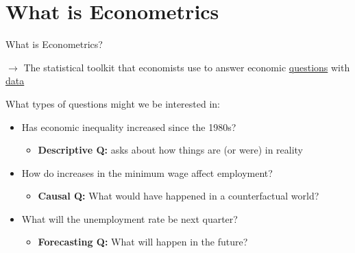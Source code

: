 \documentclass[11pt,english]{beamer}
\begin{document}
\section{What is Econometrics}
\begin{frame}{What is Econometrics?}

\vspace{0.2cm}
$\rightarrow$ The statistical toolkit that economists use to answer economic \uline{questions} with \uline{data}
\bigskip 

What types of questions might we be interested in: 
\pause
\medskip

\begin{itemize}
\item<1-> Has economic inequality increased since the 1980s?
	\begin{itemize}
		\item<3-> \textbf{Descriptive Q:} asks about how things are (or were) in reality
	\end{itemize}
\item<1-> How do increases in the minimum wage affect employment? 
	\begin{itemize}
		\item<4-> \textbf{Causal Q:} What would have happened in a counterfactual world?  
	\end{itemize}
\item<1->   What will the unemployment rate be next quarter?
	\begin{itemize}
	\item<5-> \textbf{Forecasting Q:} What will happen in the future?  
\end{itemize}

\end{itemize}
\medskip

\pause 
{}

\end{frame}
\end{document}
